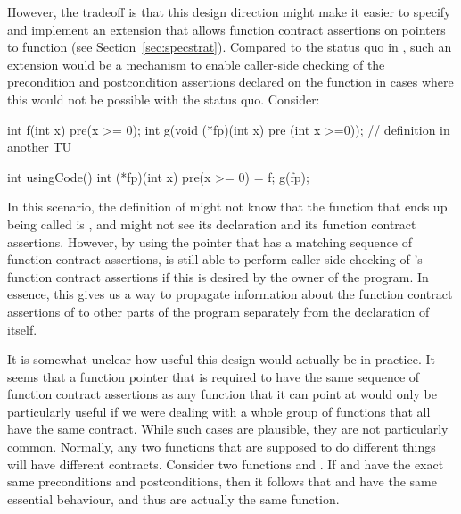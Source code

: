 However, the tradeoff is that this design direction might make it easier to specify and implement an extension that allows function contract assertions on pointers to function (see Section~\ref{sec:specstrat}). Compared to the status quo in \cite{P2900R7}, such an extension would be a mechanism to enable caller-side checking of the precondition and postcondition assertions declared on the function in cases where this would not be possible with the status quo. Consider:
\begin{codeblock}
int f(int x) pre(x >= 0);
int g(void (*fp)(int x) pre (int x >=0)); // definition in another TU

int usingCode() {
   int (*fp)(int x) pre(x >= 0) = f;
   g(fp);
}
\end{codeblock}
In this scenario, the definition of  might not know that the function that ends up being called is , and might not see its declaration and its function contract assertions. However, by using the pointer  that has a matching sequence of function contract assertions,  is still able to perform caller-side checking of 's function contract assertions if this is desired by the owner of the program. In essence, this gives us a way to propagate information about the function contract assertions of  to other parts of the program separately from the declaration of  itself.

It is somewhat unclear how useful this design would actually be in practice. It seems that a function pointer that is required to have the same sequence of function contract assertions as any function that it can point at would only be particularly useful if we were dealing with a whole group of functions that all have the same contract. While such cases are plausible, they are not particularly common. Normally, any two functions that are supposed to do different things will have different contracts. Consider two functions  and . If  and  have the exact same preconditions and postconditions, then it follows that  and  have the same essential behaviour, and thus are actually the same function.

